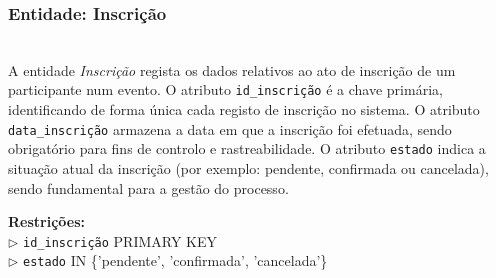 \documentclass[runningheads]{llncs}
\begin{document}
                    \noindent\begin{minipage}{\textwidth}
                    \subsubsection{Entidade: Inscrição}\mbox{}\\

                    A entidade \textit{Inscrição} regista os dados relativos ao ato de inscrição de um participante
                    num evento. O atributo \texttt{id\_inscrição} é a chave primária, identificando de forma única
                    cada registo de inscrição no sistema. O atributo \texttt{data\_inscrição} armazena a data em
                    que a inscrição foi efetuada, sendo obrigatório para fins de controlo e rastreabilidade.
                    O atributo \texttt{estado} indica a situação atual da inscrição (por exemplo: pendente,
                    confirmada ou cancelada), sendo fundamental para a gestão do processo.

                    \begin{table}[H]
                    \centering
                    \renewcommand{\arraystretch}{1.5}
                    \vspace{0.2cm}
                    \caption{Atributos da entidade Inscrição}
                    \label{tab:inscricao}
                    \end{table}
                    \vspace{0.1cm}
                    \noindent\textbf{Restrições:}\\
                    \indent $\triangleright$ \texttt{id\_inscrição} PRIMARY KEY\\
                    \indent $\triangleright$ \texttt{estado} IN \{'pendente', 'confirmada', 'cancelada'\}
                    \end{minipage}
                    \vspace{0.4cm}
\end{document}
